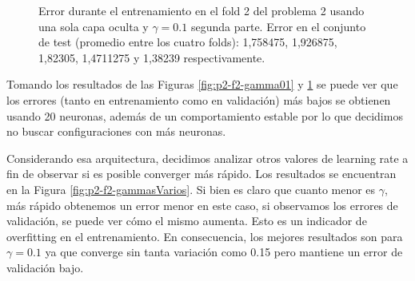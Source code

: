 \documentclass[informe.tex]{subfiles}
\begin{document}
\begin{figure}[H]
        \caption{Error durante el entrenamiento en el fold 2 del problema 2 usando una sola capa oculta y $\gamma=0.1$ segunda parte. Error en el conjunto de test (promedio entre los cuatro folds): 1,758475, 1,926875, 1,82305, 1,4711275 y 1,38239 respectivamente.}\label{fig:p2-f2-gamma01-segundaParte}
    \end{figure}
    
    
    Tomando los resultados de las Figuras \ref{fig:p2-f2-gamma01} y \ref{fig:p2-f2-gamma01-segundaParte} se puede ver que los errores (tanto en entrenamiento como en validaci\'on) m\'as bajos se obtienen usando 20 neuronas, además de un comportamiento estable por lo que decidimos no buscar configuraciones con más neuronas.
    
    Considerando esa arquitectura, decidimos analizar otros valores de learning rate a fin de observar si es posible converger m\'as r\'apido. Los resultados se encuentran en la Figura \ref{fig:p2-f2-gammasVarios}. Si bien es claro que cuanto menor es $\gamma$, m\'as r\'apido obtenemos un error menor en este caso, si observamos los errores de validaci\'on, se puede ver c\'omo el mismo aumenta. Esto es un indicador de overfitting en el entrenamiento. En consecuencia, los mejores resultados son para $\gamma=0.1$ ya que converge sin tanta variaci\'on como 0.15 pero mantiene un error de validaci\'on bajo.
    
    \FloatBarrier
    
\end{document}
